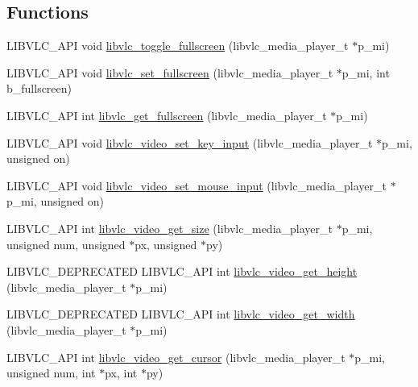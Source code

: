 \subsection*{Functions}
\begin{DoxyCompactItemize}
\item 
L\+I\+B\+V\+L\+C\+\_\+\+A\+PI void \hyperlink{group__libvlc__video_ga5e832c8ecc0de57b13a498db03ed8526}{libvlc\+\_\+toggle\+\_\+fullscreen} (libvlc\+\_\+media\+\_\+player\+\_\+t $\ast$p\+\_\+mi)
\item 
L\+I\+B\+V\+L\+C\+\_\+\+A\+PI void \hyperlink{group__libvlc__video_ga26892692dcb079743c9c7e0df3308ea4}{libvlc\+\_\+set\+\_\+fullscreen} (libvlc\+\_\+media\+\_\+player\+\_\+t $\ast$p\+\_\+mi, int b\+\_\+fullscreen)
\item 
L\+I\+B\+V\+L\+C\+\_\+\+A\+PI int \hyperlink{group__libvlc__video_ga2e28bd3d53efa45081872ad83795f421}{libvlc\+\_\+get\+\_\+fullscreen} (libvlc\+\_\+media\+\_\+player\+\_\+t $\ast$p\+\_\+mi)
\item 
L\+I\+B\+V\+L\+C\+\_\+\+A\+PI void \hyperlink{group__libvlc__video_ga8636dead7f51bd9fb7f82c17f3e46236}{libvlc\+\_\+video\+\_\+set\+\_\+key\+\_\+input} (libvlc\+\_\+media\+\_\+player\+\_\+t $\ast$p\+\_\+mi, unsigned on)
\item 
L\+I\+B\+V\+L\+C\+\_\+\+A\+PI void \hyperlink{group__libvlc__video_gad53def725dd5a50a3823b68ed31bca1a}{libvlc\+\_\+video\+\_\+set\+\_\+mouse\+\_\+input} (libvlc\+\_\+media\+\_\+player\+\_\+t $\ast$p\+\_\+mi, unsigned on)
\item 
L\+I\+B\+V\+L\+C\+\_\+\+A\+PI int \hyperlink{group__libvlc__video_ga3cb7efa452da1f718013da0f169396a7}{libvlc\+\_\+video\+\_\+get\+\_\+size} (libvlc\+\_\+media\+\_\+player\+\_\+t $\ast$p\+\_\+mi, unsigned num, unsigned $\ast$px, unsigned $\ast$py)
\item 
L\+I\+B\+V\+L\+C\+\_\+\+D\+E\+P\+R\+E\+C\+A\+T\+ED L\+I\+B\+V\+L\+C\+\_\+\+A\+PI int \hyperlink{group__libvlc__video_gaacb14ac1ff0ec4fa8e47de4a57ebd7a3}{libvlc\+\_\+video\+\_\+get\+\_\+height} (libvlc\+\_\+media\+\_\+player\+\_\+t $\ast$p\+\_\+mi)
\item 
L\+I\+B\+V\+L\+C\+\_\+\+D\+E\+P\+R\+E\+C\+A\+T\+ED L\+I\+B\+V\+L\+C\+\_\+\+A\+PI int \hyperlink{group__libvlc__video_gad585bfac7ed2b59f2e84c43e6459a76a}{libvlc\+\_\+video\+\_\+get\+\_\+width} (libvlc\+\_\+media\+\_\+player\+\_\+t $\ast$p\+\_\+mi)
\item 
L\+I\+B\+V\+L\+C\+\_\+\+A\+PI int \hyperlink{group__libvlc__video_gae9e67bc9137941aa621d3febf2ce95da}{libvlc\+\_\+video\+\_\+get\+\_\+cursor} (libvlc\+\_\+media\+\_\+player\+\_\+t $\ast$p\+\_\+mi, unsigned num, int $\ast$px, int $\ast$py)

\end{DoxyCompactItemize}
